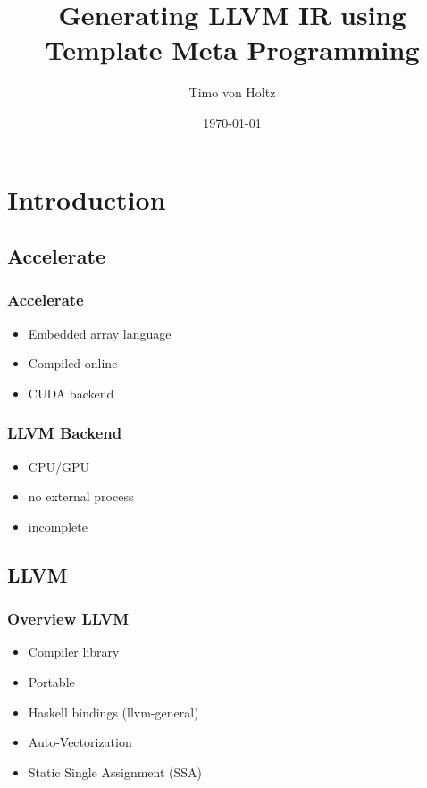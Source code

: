 \documentclass[14pt]{beamer}\beamertemplatenavigationsymbolsempty
\title{Generating LLVM IR using
Template Meta Programming}
\author{Timo von Holtz}
\date{\today}
\begin{document}
\maketitle

\section{Introduction}
\subsection{Accelerate}
\begin{frame}
 \frametitle{Accelerate}
 \begin{itemize}
\item Embedded array language
\item Compiled online
\item CUDA backend
\end{itemize}
\end{frame}

\begin{frame}
 \frametitle{LLVM Backend}
\begin{itemize}
\item CPU/GPU
\item no external process
\item incomplete
\end{itemize}
\end{frame}
\subsection{LLVM}
\begin{frame}
 \frametitle{Overview LLVM}
\begin{itemize}
\item Compiler library
\item Portable
\item Haskell bindings (llvm-general)
\item Auto-Vectorization
\item Static Single Assignment (SSA)
\end{itemize}
\end{frame}
\end{document}
